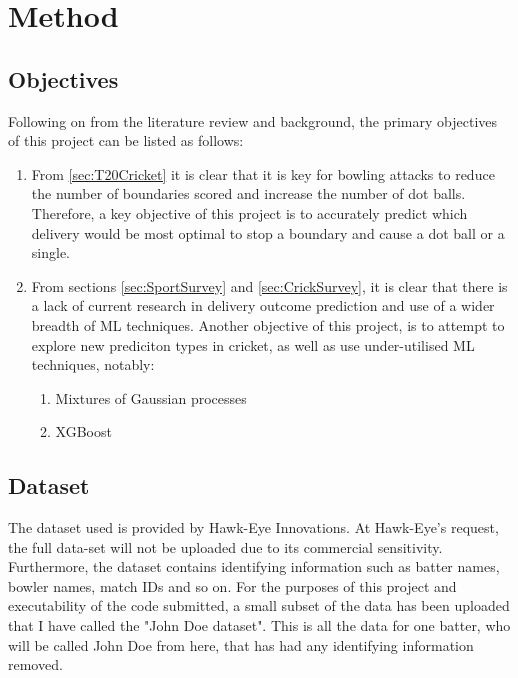 \documentclass[12pt,a4paper]{report}
\theoremstyle{definition}
\begin{document}
\chapter{Method} \label{chap:Method}

\section{Objectives}

Following on from the literature review and background, the primary objectives of this project can be listed as follows:

\begin{enumerate}
  \item From \ref{sec:T20Cricket} it is clear that it is key for bowling attacks to reduce the number of boundaries scored and increase the number of dot balls.
Therefore, a key objective of this project is to accurately predict which delivery would be most optimal to stop a boundary and cause a dot ball or a single.
  \item From sections \ref{sec:SportSurvey} and \ref{sec:CrickSurvey}, it is clear that there is a lack of current research in delivery outcome prediction and use of a wider breadth of ML techniques. 
Another objective of this project, is to attempt to explore new prediciton types in cricket, as well as use under-utilised  ML techniques, notably:
  \begin{enumerate}
	\item Mixtures of Gaussian processes
	\item XGBoost
  \end{enumerate}
\end{enumerate}

\section{Dataset} \label{sec:Dataset}

The dataset used is provided by Hawk-Eye Innovations.
At Hawk-Eye's request, the full data-set will not be uploaded due to its commercial sensitivity.
Furthermore, the dataset contains identifying information such as batter names, bowler names, match IDs and so on.
For the purposes of this project and executability of the code submitted, a small subset of the data has been uploaded that I have called the "John Doe dataset". 
This is all the data for one batter, who will be called John Doe from here, that has had any identifying information removed.
\end{document}
